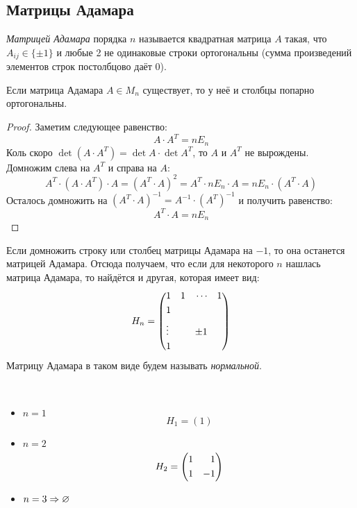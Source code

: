 \subsection{Матрицы Адамара}

\begin{definition}
	\textit{Матрицей Адамара} порядка $n$ называется квадратная матрица $A$ такая, что $A_{ij} \in \{\pm 1\}$ и любые 2 не одинаковые строки ортогональны (сумма произведений элементов строк постолбцово даёт 0).
\end{definition}

\begin{proposition}
	Если матрица Адамара $A \in M_n$ существует, то у неё и столбцы попарно ортогональны.
\end{proposition}

\begin{proof}
	Заметим следующее равенство:
	\[
		A \cdot A^T = nE_n
	\]
	Коль скоро $\det (A \cdot A^T) = \det A \cdot \det A^T$, то $A$ и $A^T$ не вырождены. Домножим слева на $A^T$ и справа на $A$:
	\[
		A^T \cdot (A \cdot A^T) \cdot A = (A^T \cdot A)^2 = A^T \cdot nE_n \cdot A = nE_n \cdot (A^T \cdot A)
	\]
	Осталось домножить на $(A^T \cdot A)^{-1} = A^{-1} \cdot (A^T)^{-1}$ и получить равенство:
	\[
		A^T \cdot A = nE_n
	\]
\end{proof}

\begin{corollary}
	Если домножить строку или столбец матрицы Адамара на $-1$, то она останется матрицей Адамара. Отсюда получаем, что если для некоторого $n$ нашлась матрица Адамара, то найдётся и другая, которая имеет вид:
	\[
		H_n = \left(\begin{aligned}
			&1 &1 & &\cdots& &1 \\
			&1 &&&&\\
			&\vdots &&&\pm 1 & \\
			&1 &&&&
		\end{aligned}\right)
	\]
	Матрицу Адамара в таком виде будем называть \textit{нормальной}.
\end{corollary}

\begin{example}~
	\begin{itemize}
		\item $n = 1$
		\[
			H_1 = (1)
		\]
		
		\item $n = 2$
		\[
			H_2 = \left(\begin{aligned}&1 &1 \\ &1 &-1\end{aligned}\right)
		\]
		
		\item $n = 3 \Rightarrow \varnothing$
	\end{itemize}
\end{example}

